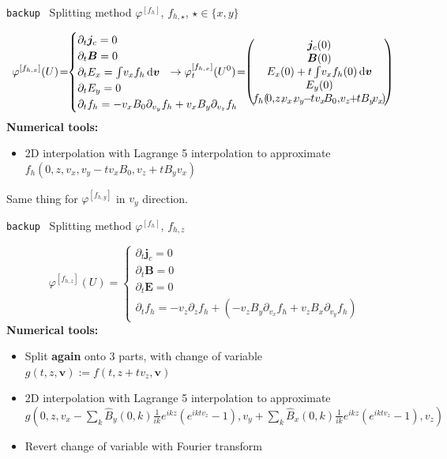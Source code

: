 \documentclass{beamer}
\newcommand{\mbold}[1]{{\textbf{\color{PLB}#1}}}
\newcommand{\Mvb}[1]{\boldsymbol{#1}}
\newenvironment{bframe}[1]%
{%
  \begin{frame}{{\small\texttt{backup}\ } #1}
}%
{%
  \end{frame}
}
\begin{document}
\begin{bframe}{Splitting method $\varphi^{[f_h]}$, $f_{h,\star}$, $\star\in\{x,y\}$}
  $$
    \!\!\varphi^{[f_{h,x}]}(U)\!=\!\!
    \begin{cases}
      \partial_t \Mvb{j}_c = 0 \\
      \partial_t \Mvb{B} = 0 \\
      \partial_t E_x = \int\!v_x f_h\dd{\Mvb{v}} \\
      \partial_t E_y = 0 \\
      \partial_t f_h = -v_x B_0\partial_{v_y} f_h + v_x B_y\partial_{v_z}f_h 
    \end{cases}
    \hspace{-2.625cm}
    \rightarrow
    \varphi_t^{[f_{h,x}]}(U^0)\!=\!\!\begin{pmatrix}
      \Mvb{j}_c(0) \\
      \Mvb{B}(0) \\
      E_x(0) + t\int\!v_xf_h(0)\dd{\Mvb{v}} \\
      E_y(0) \\
      \!f_h(\!0,\!z,\!\!v_x,\!\!v_y\!\!-\!\!tv_x\!B_0,\!v_z\!\!+\!\!tB_y\!v_x\!)\!
    \end{pmatrix}
  $$
  \mbold{Numerical tools:}
  \begin{itemize}
    \item 2D interpolation with Lagrange 5 interpolation to approximate $f_h(0,z,v_x,v_y-tv_xB_0,v_z+tB_yv_x)$
  \end{itemize}
  Same thing for $\varphi^{[f_{h,y}]}$ in $v_y$ direction.
\end{bframe}
\begin{bframe}{Splitting method $\varphi^{[f_h]}$, $f_{h,z}$}
  $$
    \varphi^{[f_{h,z}]}(U) =
    \begin{cases}
      \partial_t \Mvb{j}_c = 0 \\
      \partial_t \Mvb{B} = 0 \\
      \partial_t \Mvb{E} = 0 \\
      \partial_t f_h = -v_z\partial_zf_h + (-v_zB_y\partial_{v_x}f_h + v_zB_x\partial_{v_y}f_h) 
    \end{cases}
  $$
  \mbold{Numerical tools:}
  \begin{itemize}
    \item Split \mbold{again} onto 3 parts, with change of variable $g(t,z,\Mvb{v}):=f(t,z+tv_z,\Mvb{v})$
    \item 2D interpolation with Lagrange 5 interpolation to approximate $g(0,z,v_x-\sum_k\hat{B}_{y}(0,k)\frac{1}{ik}e^{ikz}(e^{iktv_z}-1), v_y+\sum_k\hat{B}_x(0,k)\frac{1}{ik}e^{ikz}(e^{iktv_z}-1),v_z)$
     \item Revert change of variable with Fourier transform
  \end{itemize}
\end{bframe}
\end{document}
